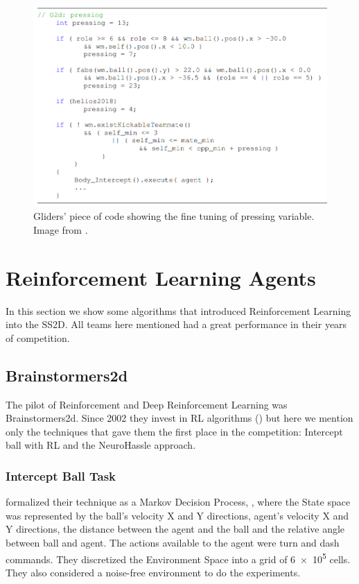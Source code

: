 \begin{figure}[H]
    \centering
    \includegraphics[scale=0.5]{images/gliders_pressing.png}
    \caption{Gliders' piece of code showing the fine tuning of pressing variable. Image from \cite{glidersv1}.}
    \label{fig:gliderscode}
\end{figure}

\section{Reinforcement Learning Agents}\label{section:RLAgents}
In this section we show some algorithms that introduced Reinforcement Learning into the SS2D. All teams here mentioned had a great performance in their years of competition.

\subsection{Brainstormers2d}
The pilot of Reinforcement and Deep Reinforcement Learning was Brainstormers2d. Since 2002 they invest in RL algorithms (\cite{brainstormers2002}) but here we mention only the techniques that gave them the first place in the competition: Intercept ball with RL and the NeuroHassle approach.
\subsubsection{Intercept Ball Task}
\cite{brainstormersIntercept} formalized their technique as a Markov Decision Process, \cite{bertsekas1996neuro}, where the State space was represented by the ball's velocity X and Y directions, agent's velocity X and Y directions, the distance between the agent and the ball and the relative angle between ball and agent. The actions available to the agent were turn and dash commands. They discretized the Environment Space into a grid of \num{6e5} cells. They also considered a noise-free environment to do the experiments.

